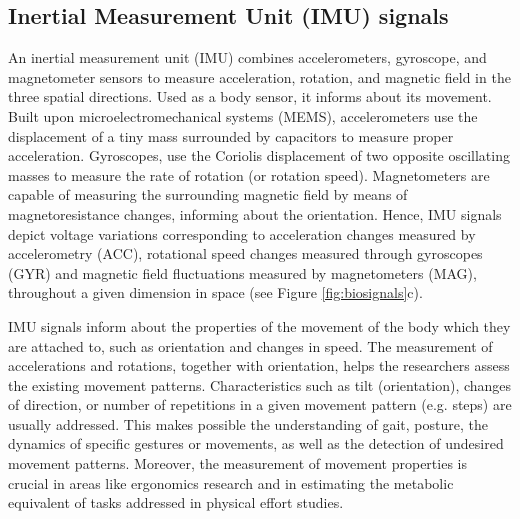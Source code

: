 \subsection*{Inertial Measurement Unit (IMU) signals}
An inertial measurement unit (IMU) combines accelerometers, gyroscope, and magnetometer sensors to measure acceleration, rotation, and magnetic field in the three spatial directions. Used as a body sensor, it informs about its movement. Built upon microelectromechanical systems (MEMS), accelerometers use the displacement of a tiny mass surrounded by capacitors to measure proper acceleration. Gyroscopes, use the Coriolis displacement of two opposite oscillating masses to measure the rate of rotation (or rotation speed). Magnetometers are capable of measuring the surrounding magnetic field by means of magnetoresistance changes, informing about the orientation. Hence, IMU signals depict voltage variations corresponding to acceleration changes measured by accelerometry (ACC), rotational speed changes measured through gyroscopes (GYR) and magnetic field fluctuations measured by magnetometers (MAG), throughout a given dimension in space
(see Figure \ref{fig:biosignals}c).

IMU signals inform about the properties of the movement of the body which they are attached to, such as orientation and changes in speed. The measurement of accelerations and rotations, together with orientation, helps the researchers assess the existing movement patterns. Characteristics such as tilt (orientation), changes of direction, or number of repetitions in a given movement pattern (e.g. steps) are usually addressed. This makes possible the understanding of gait, posture, the dynamics of specific gestures or movements, as well as the detection of undesired movement patterns. Moreover, the measurement of movement properties is crucial in areas like ergonomics research and in estimating the metabolic equivalent of tasks addressed in physical effort studies.


